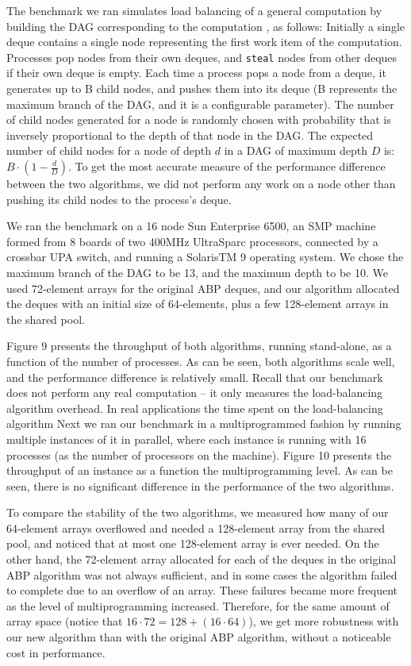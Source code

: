 The benchmark we ran simulates load balancing of a general computation
by building the DAG corresponding to the computation
\cite{Blumofe1999}, as follows: Initially a single deque contains a
single node representing the first work item of the
computation. Processes pop nodes from their own deques, and
\lstinline!steal! nodes from other deques if their own deque is
empty. Each time a process pops a node from a deque, it generates up
to B child nodes, and pushes them into its deque (B represents the
maximum branch of the DAG, and it is a configurable parameter). The
number of child nodes generated for a node is randomly chosen with
probability that is inversely proportional to the depth of that node
in the DAG. The expected number of child nodes for a node of depth $d$
in a DAG of maximum depth $D$ is: $B \cdot \left(1 - \frac{d}{D}
\right)$. To get the most accurate measure of the performance
difference between the two algorithms, we did not perform any work on
a node other than pushing its child nodes to the process's deque.

We ran the benchmark on a 16 node Sun Enterprise 6500, an SMP machine
formed from 8 boards of two 400MHz UltraSparc processors, connected by
a crossbar UPA switch, and running a SolarisTM 9 operating system. We
chose the maximum branch of the DAG to be 13, and the maximum depth to
be 10. We used 72-element arrays for the original ABP deques, and our
algorithm allocated the deques with an initial size of 64-elements,
plus a few 128-element arrays in the shared pool.

Figure 9 presents the throughput of both algorithms, running
stand-alone, as a function of the number of processes. As can be
seen, both algorithms scale well, and the performance difference is
relatively small. Recall that our benchmark does not perform any real
computation -- it only measures the load-balancing algorithm
overhead. In real applications the time spent on the load-balancing
algorithm Next we ran our benchmark in a multiprogrammed fashion by
running multiple instances of it in parallel, where each instance is
running with 16 processes (as the number of processors on the
machine). Figure 10 presents the throughput of an instance as a
function the multiprogramming level. As can be seen, there is no
significant difference in the performance of the two algorithms.

To compare the stability of the two algorithms, we measured how many
of our 64-element arrays overflowed and needed a 128-element array
from the shared pool, and noticed that at most one 128-element array
is ever needed. On the other hand, the 72-element array allocated for
each of the deques in the original ABP algorithm was not always
sufficient, and in some cases the algorithm failed to complete due to
an overflow of an array. These failures became more frequent as the
level of multiprogramming increased. Therefore, for the same amount of
array space (notice that $16 \cdot 72 = 128 + (16 \cdot 64)$), we get
more robustness with our new algorithm than with the original ABP
algorithm, without a noticeable cost in performance.

